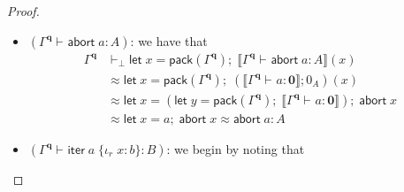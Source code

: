 \documentclass[acmsmall,screen,anonymous,review]{acmart}
\newcommand{\mb}[1]{\ensuremath{\mathbf{#1}}}
\newcommand{\ms}[1]{\ensuremath{\mathsf{#1}}}
\newcommand{\lto}{:}
\newcommand{\linl}[1]{\iota_l\;{#1}}
\newcommand{\linr}[1]{\iota_r\;{#1}}
\newcommand{\labort}[1]{\ms{abort}\;{#1}}
\newcommand{\letexpr}[3]{\ensuremath{\ms{let}\;#1 = #2;\;#3}}
\newcommand{\caseexpr}[5]{\ms{case}\;#1\;\{\linl{#2} \lto #3, \linr{#4} \lto #5\}}
\newcommand{\liter}[3]{\ms{iter}\;#1\;\{ \linr{#2} \lto #3 \}}
\newcommand{\hasty}[4]{#1 \vdash_{#2} #3: {#4}}
\newcommand{\dnt}[1]{\llbracket{#1}\rrbracket}
\begin{document}
\begin{proof}
\begin{itemize}
\begin{align*}
      \letexpr{z}{(\ms{pack}(\Gamma^{\mb{q}_l}), 
        \letexpr{w}{\ms{pack}(\Gamma^{\mb{q}_r})}{
          \dnt{\hasty{\Gamma^{\mb{q}_r}}{\epsilon}{e}{A + B}}(w)})}{(  \\ & \qquad
        \delta^{-1}
        ; [
          \dnt{\hasty{\Gamma^{\mb{q}_l}, x : A}{\epsilon}{a}{C}},
          \dnt{\hasty{\Gamma^{\mb{q}_l}, y : B}{\epsilon}{b}{C}}
        ])(z)}
      \\ &\approx
      \letexpr{z}{(\ms{pack}(\Gamma^{\mb{q}_l}), e)}{(
        \delta^{-1}
        ; [
          \dnt{\hasty{\Gamma^{\mb{q}_l}, x : A}{\epsilon}{a}{C}},
          \dnt{\hasty{\Gamma^{\mb{q}_l}, y : B}{\epsilon}{b}{C}}
        ])(z)}
      \\ &\approx
      \caseexpr{e \\ & \qquad\;}
        {x}{\letexpr{w}{(\ms{pack}(\Gamma^{\mb{q}_l}), x)}{
          \dnt{\hasty{\Gamma^{\mb{q}_l}, x : A}{\epsilon}{a}{C}}(w)} \\ & \qquad}
        {y}{\letexpr{}{(\ms{pack}(\Gamma^{\mb{q}_l}), y)}{
          \dnt{\hasty{\Gamma^{\mb{q}_l}, y : B}{\epsilon}{b}{C}}}}
      \\ &\approx
      \caseexpr{e \\ & \qquad}
        {x}{\letexpr{w}{\ms{pack}(\Gamma^{\mb{q}_l}, x : A))}{
          \dnt{\hasty{\Gamma^{\mb{q}_l}, x : A}{\epsilon}{a}{C}}(w)} \\ & \qquad}
        {y}{\letexpr{}{\ms{pack}(\Gamma^{\mb{q}_l}), y : B)}{
          \dnt{\hasty{\Gamma^{\mb{q}_l}, y : B}{\epsilon}{b}{C}}}}
      \\ &\approx
      \caseexpr{e}{x}{a}{y}{b} : C
    \end{align*}
    \item $(\hasty{\Gamma^{\mb{q}}}{}{\labort{a}}{A})$: we have that
    \begin{align*}
    \Gamma^{\mb{q}} &\vdash_\bot
      \letexpr{x}{\ms{pack}(\Gamma^{\mb{q}})}{\dnt{\hasty{\Gamma^{\mb{q}}}{}{\labort{a}}{A}}(x)}
      \\ &\approx 
      \letexpr{x}{\ms{pack}(\Gamma^{\mb{q}})}
        {(\dnt{\hasty{\Gamma^{\mb{q}}}{}{a}{\mb{0}}} ; 0_A)(x)}
      \\ &\approx
      \letexpr{x}{(\letexpr{y}{\ms{pack}(\Gamma^{\mb{q}})}
          {\dnt{\hasty{\Gamma^{\mb{q}}}{}{a}{\mb{0}}}})}
        {\labort{x}} 
      \\ &\approx
      \letexpr{x}{a}{\labort{x}} \approx \labort{a} : A
    \end{align*}
    \item $(\hasty{\Gamma^{\mb{q}}}{}{\liter{a}{x}{b}}{B})$: we begin by noting that

\end{itemize}
\end{proof}
\end{document}
